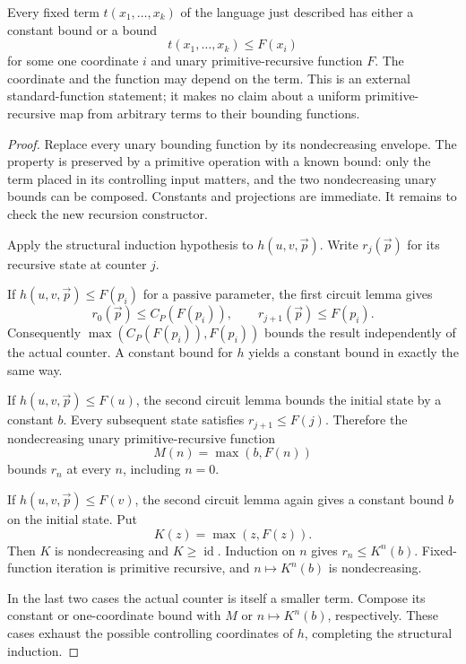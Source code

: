 \begin{theorem}
Every fixed term $t(x_1,\ldots,x_k)$ of the language just described has
either a constant bound or a bound
\[
              t(x_1,\ldots,x_k)\le F(x_i)
\]
for some one coordinate $i$ and unary primitive-recursive function $F$.
The coordinate and the function may depend on the term. This is an
external standard-function statement; it makes no claim about a uniform
primitive-recursive map from arbitrary terms to their bounding functions.
\end{theorem}
\begin{proof}
Replace every unary bounding function by its nondecreasing envelope.
The property is preserved by a primitive operation with a known bound:
only the term placed in its controlling input matters, and the two
nondecreasing unary bounds can be composed. Constants and projections
are immediate. It remains to check the new recursion constructor.

Apply the structural induction hypothesis to
$h(u,v,\vec p)$. Write $r_j(\vec p)$ for its recursive state at counter
$j$.

If $h(u,v,\vec p)\le F(p_i)$ for a passive parameter, the first circuit
lemma gives
\[
 r_0(\vec p)\le C_P(F(p_i)),\qquad
 r_{j+1}(\vec p)\le F(p_i).
\]
Consequently $\max(C_P(F(p_i)),F(p_i))$ bounds the result independently
of the actual counter. A constant bound for $h$ yields a constant bound
in exactly the same way.

If $h(u,v,\vec p)\le F(u)$, the second circuit lemma bounds the initial
state by a constant $b$. Every subsequent state satisfies
$r_{j+1}\le F(j)$. Therefore the nondecreasing unary primitive-recursive
function
\[
                       M(n)=\max(b,F(n))
\]
bounds $r_n$ at every $n$, including $n=0$.

If $h(u,v,\vec p)\le F(v)$, the second circuit lemma again gives a
constant bound $b$ on the initial state. Put
\[
                       K(z)=\max(z,F(z)).
\]
Then $K$ is nondecreasing and $K\ge\operatorname{id}$. Induction on $n$
gives $r_n\le K^n(b)$. Fixed-function iteration is primitive recursive,
and $n\mapsto K^n(b)$ is nondecreasing.

In the last two cases the actual counter is itself a smaller term.
Compose its constant or one-coordinate bound with $M$ or
$n\mapsto K^n(b)$, respectively. These cases exhaust the possible
controlling coordinates of $h$, completing the structural induction.
\end{proof}

